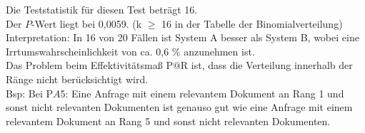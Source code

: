 Die Teststatistik für diesen Test beträgt 16.\\
Der $P$-Wert liegt bei 0,0059. (k $\ge$ 16 in der Tabelle der Binomialverteilung)\\
Interpretation: In 16 von 20 Fällen ist System A besser als System B, wobei eine Irrtumswahrscheinlichkeit von ca. 0,6 \% anzunehmen ist.\\
Das Problem beim Effektivitätsmaß P$@$R ist, dass die Verteilung innerhalb der Ränge nicht berücksichtigt wird.\\Bsp: Bei P$A$5: Eine Anfrage mit einem relevantem Dokument an Rang 1 und sonst nicht relevanten Dokumenten ist genauso gut wie eine Anfrage mit einem relevantem Dokument an Rang 5 und sonst nicht relevanten Dokumenten.\\